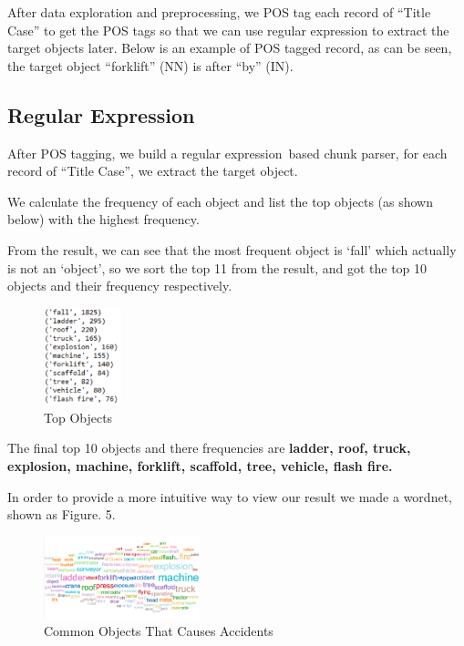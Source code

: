 \documentclass[DIV=calc, paper=a4, fontsize=11pt, twocolumn]{scrartcl}	 %
\begin{document}
After data exploration and preprocessing, we POS tag each record of
“Title Case” to get the POS tags so that we can use regular expression
to extract the target objects later. Below is an example of POS tagged
record, as can be seen, the target object “forklift” (NN) is after
“by” (IN).


\subsection{Regular Expression}
After POS tagging, we build a regular expression based chunk parser,
for each record of “Title Case”, we extract the target object.

We calculate the frequency of each object and list the top objects
(as shown below) with the highest frequency.

From the result, we can see that the most frequent object is ‘fall’
which actually is not an ‘object’, so we sort the top 11 from the
result, and got the top 10 objects and their frequency respectively.


\begin{figure}[h!]
  \centering
      \includegraphics[width=0.2\textwidth]{obj11.png}
   \caption{Top Objects}
\end{figure}

The final top 10 objects and there frequencies are {\bf ladder, roof,
  truck, explosion, machine, forklift, scaffold, tree, vehicle, flash fire.
}

In order to provide a more intuitive way to view our result we made a
wordnet, shown as Figure. 5.


\begin{figure}[h!]
  \centering
      \includegraphics[width=0.4\textwidth]{common_objects.png}
   \caption{Common Objects That Causes Accidents}
\end{figure}
\end{document}
